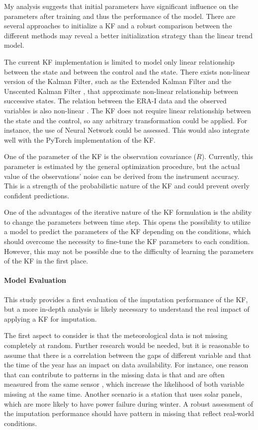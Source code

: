 \documentclass{article}
\begin{document}
My analysis suggests that initial parameters have significant influence on the parameters after training and thus the performance of the model. There are several approaches to initialize a KF \cite{durbin_time_2012} and a robust comparison between the different methods may reveal a better initialization strategy than the linear trend model.  

The current KF implementation is limited to model only linear relationship between the state and between the control and the state. There exists non-linear version of the Kalman Filter, such as the Extended Kalman Filter and the Unscented Kalman Filter \cite{dan_simon_optimal_2006}, that approximate non-linear relationship between successive states.
The relation between the ERA-I data and the observed variables is also non-linear \cite{vuichard_filling_2015}. The KF does not require linear relationship between the state and the control, so any arbitrary transformation could be applied. For instance, the use of Neural Network could be assessed. This would also integrate well with the \textsf{PyTorch} implementation of the KF.

One of the parameter of the KF is the observation covariance ($R$). Currently, this parameter is estimated by the general optimization procedure, but the actual value of the observations' noise can be derived from the instrument accuracy. This is a strength of the probabilistic nature of the KF and could prevent overly confident predictions. 

One of the advantages of the iterative nature of the KF formulation is the ability to change the parameters between time step.
This opens the possibility to utilize a model to predict the parameters of the KF depending on the conditions, which should overcome the necessity to fine-tune the KF parameters to each condition.
However, this may not be possible due to the difficulty of learning the parameters of the KF in the first place.

\paragraph{Model Evaluation} This study provides a first evaluation of the imputation performance of the KF, but a more in-depth analysis is likely necessary to understand the real impact of applying a KF for imputation.

The first aspect to consider is that the meteorological data is not missing completely at random. Further research would be needed, but it is reasonable to assume that there is a correlation between the gaps of different variable and that the time of the year has an impact on data availability. For instance, one reason that can contribute to patterns in the missing data is that  and  are often measured from the same sensor \cite{noauthor_associated_2020, noauthor_specification_nodate}, which increase the likelihood of both variable missing at the same time. Another scenario is a station that uses solar panels, which are more likely to have power failure during winter. A robust assessment of the imputation performance should have pattern in missing that reflect real-world conditions.
\end{document}
